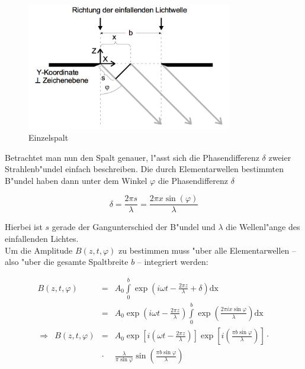 		\begin{figure}[h]
				\centering
				\includegraphics[width = 9cm]{spalt.jpg}
				\caption{Einzelspalt}
				\label{abb_spalt}
		\end{figure}

		Betrachtet man nun den Spalt genauer, l"asst sich die Phasendifferenz $\delta$ zweier Strahlenb"undel einfach beschreiben. Die durch Elementarwellen bestimmten B"undel haben dann unter dem Winkel $\varphi$ die Phasendifferenz $\delta$

		\begin{equation}
			\delta = \frac{2 \pi s}{\lambda} = \frac{2 \pi x \sin(\varphi)}{\lambda}
		\end{equation}

		Hierbei ist $s$ gerade der Gangunterschied der B"undel und $\lambda$ die Wellenl"ange des einfallenden Lichtes.\\
		Um die Amplitude $B(z, t, \varphi)$ zu bestimmen muss "uber alle Elementarwellen -- also "uber die gesamte Spaltbreite $b$ -- integriert werden:

		\begin{eqnarray}
			B(z, t, \varphi) &=& A_0 \int \limits_0^b \exp{\left(i \omega t - \frac{2 \pi z}{\lambda} + \delta \right)} \mathrm{dx} \nonumber \\
			&=& A_0 \exp{\left(i \omega t - \frac{2 \pi z}{\lambda}\right)} \int \limits_0^b \exp{\left(\frac{2 \pi i x \sin{\varphi}}{\lambda}\right)} \mathrm{dx} \nonumber\\
			\Rightarrow \enspace
			B(z, t, \varphi) &=& A_0 \exp{\left[ i \left( \omega t - \frac{2\pi z}{\lambda}
			\right) \right] } 
			\exp{\left[i \left( \frac{\pi b \sin{\varphi}}{\lambda} \right)\right]}  \cdot \nonumber \\
			&\cdot& \frac{\lambda}{\pi \sin{\varphi}}
			\sin{\left( \frac{\pi b \sin{\varphi}}{\lambda} \right)} \label{eqn:allgemeine_lsg}
		\end{eqnarray}


